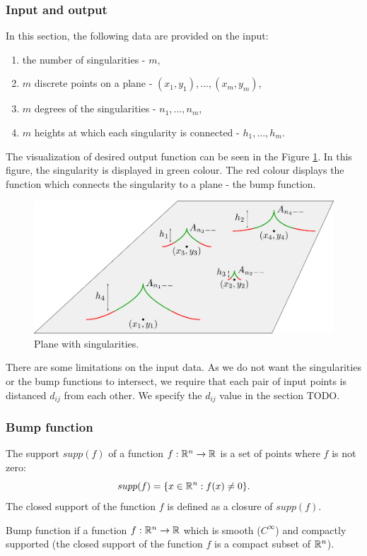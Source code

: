 \subsubsection*{Input and output}
In this section, the following data are provided on the input:
\begin{enumerate}
    \item the number of singularities - $m$,
    \item $m$ discrete points on a plane - $(x_1, y_1), ..., (x_m, y_m)$,
    \item $m$ degrees of the singularities - $n_1, ..., n_m$,
    \item $m$ heights at which each singularity is connected - $h_1, ..., h_m$.
\end{enumerate}
The visualization of desired output function can be seen in the Figure \ref{img:22}. 
In this figure, the singularity is displayed in green colour. The red colour displays the function which connects the singularity to a plane - the bump function.
\begin{figure}
    \centerline{\includegraphics[scale=0.5]{images/img22}}
    \caption[Plane with singularities.]
    {Plane with singularities.}
    \label{img:22}
\end{figure}
There are some limitations on the input data. As we do not want the singularities 
or the bump functions to intersect, we require that each pair of input points is
distanced $d_{ij}$ from each other. We specify the $d_{ij}$ value in the section TODO.
\subsubsection*{Bump function}
\begin{definition}
The support $supp(f)$ of a function $f: \mathbb{R}^n \to \mathbb{R}$ is a set of points where $f$ is not
zero: $$supp(f) = \{ x\in \mathbb{R}^n : f(x)\neq 0 \}.$$
The closed support of the function $f$ is defined as a closure of $supp(f)$.
\end{definition}
Bump function if a function $f:\mathbb{R}^n \to \mathbb{R}$ which is smooth ($C^\infty$) and
compactly supported (the closed support of the function $f$ is a compact subset
of $\mathbb{R}^n$).

